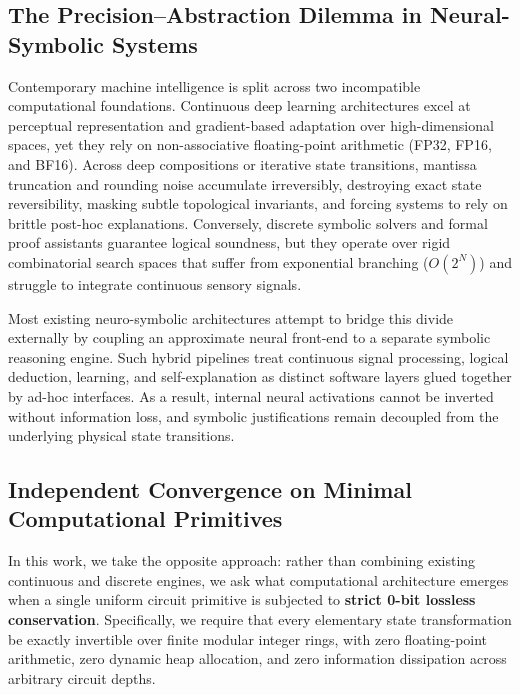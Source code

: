 \documentclass[11pt, a4paper]{article}
\begin{document}
\subsection{The Precision--Abstraction Dilemma in Neural-Symbolic Systems}
Contemporary machine intelligence is split across two incompatible computational foundations. Continuous deep learning architectures excel at perceptual representation and gradient-based adaptation over high-dimensional spaces, yet they rely on non-associative floating-point arithmetic (FP32, FP16, and BF16). Across deep compositions or iterative state transitions, mantissa truncation and rounding noise accumulate irreversibly, destroying exact state reversibility, masking subtle topological invariants, and forcing systems to rely on brittle post-hoc explanations. Conversely, discrete symbolic solvers and formal proof assistants guarantee logical soundness, but they operate over rigid combinatorial search spaces that suffer from exponential branching ($O(2^N)$) and struggle to integrate continuous sensory signals.

Most existing neuro-symbolic architectures attempt to bridge this divide externally by coupling an approximate neural front-end to a separate symbolic reasoning engine. Such hybrid pipelines treat continuous signal processing, logical deduction, learning, and self-explanation as distinct software layers glued together by ad-hoc interfaces. As a result, internal neural activations cannot be inverted without information loss, and symbolic justifications remain decoupled from the underlying physical state transitions.

\subsection{Independent Convergence on Minimal Computational Primitives}
In this work, we take the opposite approach: rather than combining existing continuous and discrete engines, we ask what computational architecture emerges when a single uniform circuit primitive is subjected to \textbf{strict 0-bit lossless conservation}. Specifically, we require that every elementary state transformation be exactly invertible over finite modular integer rings, with zero floating-point arithmetic, zero dynamic heap allocation, and zero information dissipation across arbitrary circuit depths.
\end{document}
